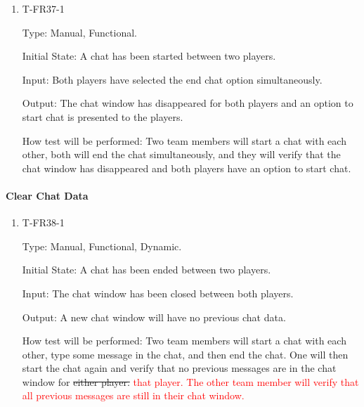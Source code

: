 \documentclass[12pt, titlepage]{article}
\begin{document}
        \begin{enumerate}

        \item{T-FR37-1\\}

            Type: Manual, Functional.
            					
            Initial State: A chat has been started between two players.
            					
            Input: Both players have selected the end chat option simultaneously.
            					
            Output: The chat window has disappeared for both players and an option to start chat is presented to the players.

            How test will be performed: Two team members will start a chat with each other, both will end the chat simultaneously, and they will verify that the chat window has disappeared and both players have an option to start chat.

        \end{enumerate}
    
    \paragraph{Clear Chat Data}

        \begin{enumerate}

        \item{T-FR38-1\\}

            Type: Manual, Functional, Dynamic.
            					
            Initial State: A chat has been ended between two players.
            					
            Input: The chat window has been closed between both players.
            					
            Output: A new chat window will have no previous chat data.

            How test will be performed: Two team members will start a chat with each other, type some message in the chat, and then end the chat. One will then start the chat again and verify that no previous messages are in the chat window for \sout{either player.} \textcolor{red}{that player. The other team member will verify that all previous messages are still in their chat window.}

        \end{enumerate}
\end{document}
